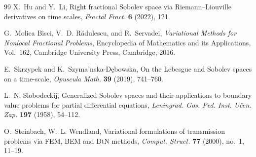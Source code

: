 \documentclass[11pt]{article}
\numberwithin{equation}{section}
\theoremstyle{definition}
\begin{document}
\begin{thebibliography}{99}
X.~Hu and Y.~Li,
Right fractional Sobolev space via Riemann--Liouville derivatives on time scales,
\emph{Fractal Fract.} \textbf{6} (2022), 121.

G.~Molica Bisci, V.~D. R\u{a}dulescu, and R.~Servadei,
\emph{Variational Methods for Nonlocal Fractional Problems},
Encyclopedia of Mathematics and its Applications, Vol.~162,
Cambridge University Press, Cambridge, 2016.

E.~Skrzypek and K.~Szyma'nska-D\k{e}bowska,
On the Lebesgue and Sobolev spaces on a time-scale,
\emph{Opuscula Math.} \textbf{39} (2019), 741--760.

L.~N. Slobodeckij,
Generalized Sobolev spaces and their applications to boundary value problems for partial differential equations,
\emph{Leningrad. Gos. Ped. Inst. U\v cen. Zap.} \textbf{197} (1958), 54--112.

O.~Steinbach, W.~L. Wendland,
Variational formulations of transmission problems via FEM, BEM and DtN methods,
\emph{Comput. Struct.} \textbf{77} (2000), no.~1, 11--19.

\end{thebibliography}
\end{document}
